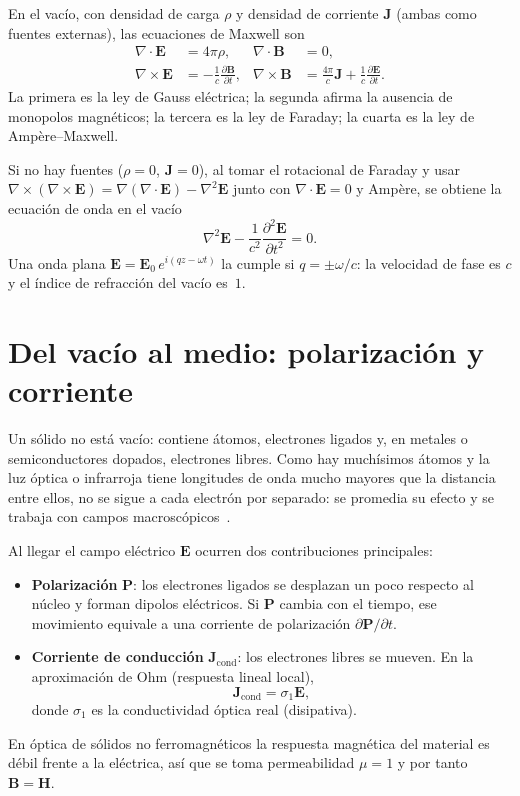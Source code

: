 En el vac\'io, con densidad de carga $\rho$ y densidad de corriente $\mathbf{J}$ (ambas como fuentes externas), las ecuaciones de Maxwell son
\begin{align}
\label{eq:maxwell-vac}
\nabla\cdot\mathbf{E}&=4\pi\rho,&
\nabla\cdot\mathbf{B}&=0,\\
\nabla\times\mathbf{E}&=-\frac{1}{c}\frac{\partial\mathbf{B}}{\partial t},&
\nabla\times\mathbf{B}&=\frac{4\pi}{c}\mathbf{J}
+\frac{1}{c}\frac{\partial\mathbf{E}}{\partial t}.
\end{align}
La primera es la ley de Gauss el\'ectrica; la segunda afirma la ausencia de monopolos magn\'eticos;
la tercera es la ley de Faraday; la cuarta es la ley de Amp\`ere--Maxwell.

Si no hay fuentes ($\rho=0$, $\mathbf{J}=0$), al tomar el rotacional de Faraday y usar
$\nabla\times(\nabla\times\mathbf{E})=\nabla(\nabla\cdot\mathbf{E})-\nabla^{2}\mathbf{E}$
junto con $\nabla\cdot\mathbf{E}=0$ y Amp\`ere, se obtiene la ecuaci\'on de onda en el vac\'io
\begin{equation}
\label{eq:onda-vacio}
\nabla^{2}\mathbf{E}-\frac{1}{c^{2}}\frac{\partial^{2}\mathbf{E}}{\partial t^{2}}=0.
\end{equation}
Una onda plana $\mathbf{E}=\mathbf{E}_{0}\,e^{i(qz-\omega t)}$ la cumple si $q=\pm\omega/c$:
la velocidad de fase es $c$ y el \'indice de refracci\'on del vac\'io es~$1$.

\section{Del vac\'io al medio: polarizaci\'on y corriente}

Un s\'olido no est\'a vac\'io: contiene \'atomos, electrones ligados y, en metales o semiconductores dopados, electrones libres.
Como hay much\'isimos \'atomos y la luz \'optica o infrarroja tiene longitudes de onda mucho mayores que la distancia entre ellos, no se sigue a cada electr\'on por separado: se promedia su efecto y se trabaja con campos macrosc\'opicos~\cite{Jackson,electrodynamics}.

Al llegar el campo el\'ectrico $\mathbf{E}$ ocurren dos contribuciones principales:
\begin{itemize}[leftmargin=*]
\item \textbf{Polarizaci\'on} $\mathbf{P}$: los electrones ligados se desplazan un poco respecto al n\'ucleo y forman dipolos el\'ectricos.
Si $\mathbf{P}$ cambia con el tiempo, ese movimiento equivale a una corriente de polarizaci\'on $\partial\mathbf{P}/\partial t$.
\item \textbf{Corriente de conducci\'on} $\mathbf{J}_{\mathrm{cond}}$: los electrones libres se mueven.
En la aproximaci\'on de Ohm (respuesta lineal local),
\begin{equation}
\label{eq:ohm}
\mathbf{J}_{\mathrm{cond}}=\sigma_1\mathbf{E},
\end{equation}
donde $\sigma_1$ es la conductividad \'optica real (disipativa).
\end{itemize}
En \'optica de s\'olidos no ferromagn\'eticos la respuesta magn\'etica del material es d\'ebil frente a la el\'ectrica, as\'i que se toma permeabilidad $\mu=1$ y por tanto $\mathbf{B}=\mathbf{H}$.

